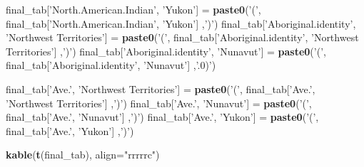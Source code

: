 \documentclass[9pt,letter]{article}
\newenvironment{Shaded}{\begin{snugshade}}{\end{snugshade}}
\newcommand{\KeywordTok}[1]{\textcolor[rgb]{0.13,0.29,0.53}{\textbf{#1}}}
\newcommand{\DataTypeTok}[1]{\textcolor[rgb]{0.13,0.29,0.53}{#1}}
\newcommand{\StringTok}[1]{\textcolor[rgb]{0.31,0.60,0.02}{#1}}
\newcommand{\NormalTok}[1]{#1}
\begin{document}
\begin{Shaded}
\begin{Highlighting}[]
\NormalTok{final_tab[}\StringTok{'North.American.Indian'}\NormalTok{, }\StringTok{'Yukon'}\NormalTok{] =}\StringTok{ }
\StringTok{  }\KeywordTok{paste0}\NormalTok{(}\StringTok{'('}\NormalTok{, final_tab[}\StringTok{'North.American.Indian'}\NormalTok{, }\StringTok{'Yukon'}\NormalTok{] ,}\StringTok{')'}\NormalTok{)}
\NormalTok{final_tab[}\StringTok{'Aboriginal.identity'}\NormalTok{, }\StringTok{'Northwest Territories'}\NormalTok{] =}\StringTok{ }
\StringTok{  }\KeywordTok{paste0}\NormalTok{(}\StringTok{'('}\NormalTok{, final_tab[}\StringTok{'Aboriginal.identity'}\NormalTok{, }\StringTok{'Northwest Territories'}\NormalTok{] ,}\StringTok{')'}\NormalTok{)}
\NormalTok{final_tab[}\StringTok{'Aboriginal.identity'}\NormalTok{, }\StringTok{'Nunavut'}\NormalTok{] =}\StringTok{ }
\StringTok{  }\KeywordTok{paste0}\NormalTok{(}\StringTok{'('}\NormalTok{, final_tab[}\StringTok{'Aboriginal.identity'}\NormalTok{, }\StringTok{'Nunavut'}\NormalTok{] ,}\StringTok{'.0)'}\NormalTok{)}

\NormalTok{final_tab[}\StringTok{'Ave.'}\NormalTok{, }\StringTok{'Northwest Territories'}\NormalTok{] =}\StringTok{ }
\StringTok{  }\KeywordTok{paste0}\NormalTok{(}\StringTok{'('}\NormalTok{, final_tab[}\StringTok{'Ave.'}\NormalTok{, }\StringTok{'Northwest Territories'}\NormalTok{] ,}\StringTok{')'}\NormalTok{)}
\NormalTok{final_tab[}\StringTok{'Ave.'}\NormalTok{, }\StringTok{'Nunavut'}\NormalTok{] =}\StringTok{ }
\StringTok{  }\KeywordTok{paste0}\NormalTok{(}\StringTok{'('}\NormalTok{, final_tab[}\StringTok{'Ave.'}\NormalTok{, }\StringTok{'Nunavut'}\NormalTok{] ,}\StringTok{')'}\NormalTok{)}
\NormalTok{final_tab[}\StringTok{'Ave.'}\NormalTok{, }\StringTok{'Yukon'}\NormalTok{] =}\StringTok{ }
\StringTok{  }\KeywordTok{paste0}\NormalTok{(}\StringTok{'('}\NormalTok{, final_tab[}\StringTok{'Ave.'}\NormalTok{, }\StringTok{'Yukon'}\NormalTok{] ,}\StringTok{')'}\NormalTok{)}

\KeywordTok{kable}\NormalTok{(}\KeywordTok{t}\NormalTok{(final_tab), }\DataTypeTok{align=}\StringTok{"rrrrrc"}\NormalTok{)}
\end{Highlighting}
\end{Shaded}
\end{document}
